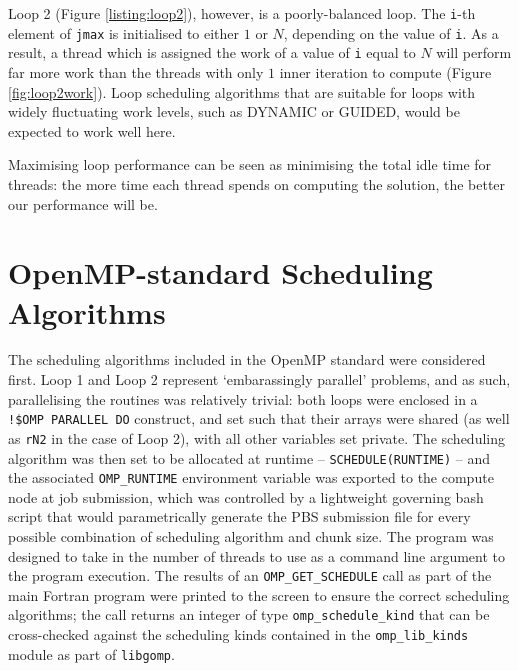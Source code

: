 \documentclass{article} %
\newcommand{\tp}{\texttt}
\begin{document}
Loop 2 (Figure \ref{listing:loop2}), however, is a poorly-balanced loop. The \texttt{i}-th element of \texttt{jmax} is initialised to either $1$ or $N$, depending on the value of \texttt{i}.
As a result, a thread which is assigned the work of a value of \texttt{i} equal to $N$ will perform far more work than the threads with only $1$ inner iteration to compute (Figure \ref{fig:loop2work}).
Loop scheduling algorithms that are suitable for loops with widely fluctuating work levels, such as DYNAMIC or GUIDED, would be expected to work well here.

Maximising loop performance can be seen as minimising the total idle time for threads: the more time each thread spends on computing the solution, the better our performance will be.

\section*{OpenMP-standard Scheduling Algorithms}

The scheduling algorithms included in the OpenMP standard were considered first.
Loop 1 and Loop 2 represent `embarassingly parallel' problems, and as such, parallelising the routines was relatively trivial: both loops were enclosed in a \tp{!\$OMP PARALLEL DO} construct, and set such that their arrays were shared (as well as \tp{rN2} in the case of Loop 2), with all other variables set private.
The scheduling algorithm was then set to be allocated at runtime -- \tp{SCHEDULE(RUNTIME)} -- and the associated \tp{OMP\_RUNTIME} environment variable was exported to the compute node at job submission, which was controlled by a lightweight governing bash script that would parametrically generate the PBS submission file for every possible combination of scheduling algorithm and chunk size. The program was designed to take in the number of threads to use as a command line argument to the program execution. The results of an \tp{OMP\_GET\_SCHEDULE} call as part of the main Fortran program were printed to the screen to ensure the correct scheduling algorithms; the call returns an integer of type \tp{omp\_schedule\_kind} that can be cross-checked against the scheduling kinds contained in the \tp{omp\_lib\_kinds} module as part of \tp{libgomp}.


\end{document}
